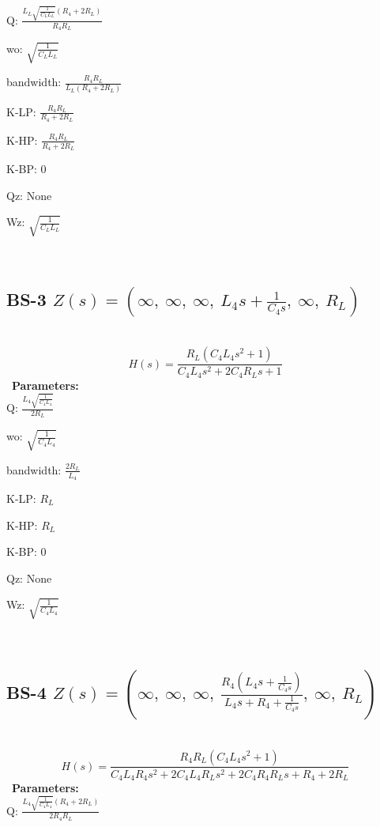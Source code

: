 \documentclass{article}
\begin{document}
Q: $\frac{L_{L} \sqrt{\frac{1}{C_{L} L_{L}}} \left(R_{4} + 2 R_{L}\right)}{R_{4} R_{L}}$\ 

wo: $\sqrt{\frac{1}{C_{L} L_{L}}}$\ 

bandwidth: $\frac{R_{4} R_{L}}{L_{L} \left(R_{4} + 2 R_{L}\right)}$\ 

K-LP: $\frac{R_{4} R_{L}}{R_{4} + 2 R_{L}}$\ 

K-HP: $\frac{R_{4} R_{L}}{R_{4} + 2 R_{L}}$\ 

K-BP: $0$\ 

Qz: $\text{None}$\ 

Wz: $\sqrt{\frac{1}{C_{L} L_{L}}}$\ 

\ 

\subsection{BS-3 $Z(s) = \left( \infty, \  \infty, \  \infty, \  L_{4} s + \frac{1}{C_{4} s}, \  \infty, \  R_{L}\right)$ } \ 
\textbf{\[H(s) = \frac{R_{L} \left(C_{4} L_{4} s^{2} + 1\right)}{C_{4} L_{4} s^{2} + 2 C_{4} R_{L} s + 1}\] } \ 
\textbf{Parameters:}\\ 

Q: $\frac{L_{4} \sqrt{\frac{1}{C_{4} L_{4}}}}{2 R_{L}}$\ 

wo: $\sqrt{\frac{1}{C_{4} L_{4}}}$\ 

bandwidth: $\frac{2 R_{L}}{L_{4}}$\ 

K-LP: $R_{L}$\ 

K-HP: $R_{L}$\ 

K-BP: $0$\ 

Qz: $\text{None}$\ 

Wz: $\sqrt{\frac{1}{C_{4} L_{4}}}$\ 

\ 

\subsection{BS-4 $Z(s) = \left( \infty, \  \infty, \  \infty, \  \frac{R_{4} \left(L_{4} s + \frac{1}{C_{4} s}\right)}{L_{4} s + R_{4} + \frac{1}{C_{4} s}}, \  \infty, \  R_{L}\right)$ } \ 
\textbf{\[H(s) = \frac{R_{4} R_{L} \left(C_{4} L_{4} s^{2} + 1\right)}{C_{4} L_{4} R_{4} s^{2} + 2 C_{4} L_{4} R_{L} s^{2} + 2 C_{4} R_{4} R_{L} s + R_{4} + 2 R_{L}}\] } \ 
\textbf{Parameters:}\\ 

Q: $\frac{L_{4} \sqrt{\frac{1}{C_{4} L_{4}}} \left(R_{4} + 2 R_{L}\right)}{2 R_{4} R_{L}}$\ 
\end{document}
